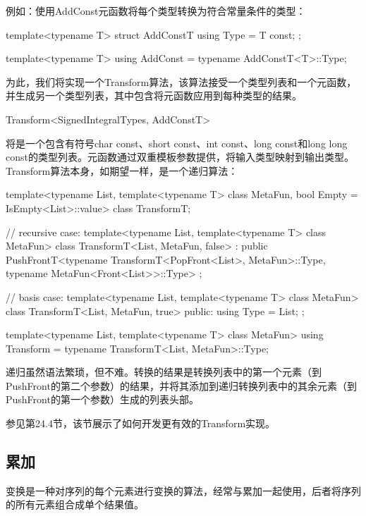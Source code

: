 例如：使用AddConst元函数将每个类型转换为符合常量条件的类型：

\begin{cpp}
template<typename T>
struct AddConstT
{
	using Type = T const;
};

template<typename T>
using AddConst = typename AddConstT<T>::Type;
\end{cpp}

为此，我们将实现一个Transform算法，该算法接受一个类型列表和一个元函数，并生成另一个类型列表，其中包含将元函数应用到每种类型的结果。

\begin{cpp}
Transform<SignedIntegralTypes, AddConstT>
\end{cpp}

将是一个包含有符号char const、short const、int const、long const和long long const的类型列表。元函数通过双重模板参数提供，将输入类型映射到输出类型。Transform算法本身，如期望一样，是一个递归算法：

\begin{cpp}
template<typename List, template<typename T> class MetaFun,
bool Empty = IsEmpty<List>::value>
class TransformT;

// recursive case:
template<typename List, template<typename T> class MetaFun>
class TransformT<List, MetaFun, false>
: public PushFrontT<typename TransformT<PopFront<List>, MetaFun>::Type,
typename MetaFun<Front<List>>::Type> {};

// basis case:
template<typename List, template<typename T> class MetaFun>
class TransformT<List, MetaFun, true> {
	public:
	using Type = List;
};

template<typename List, template<typename T> class MetaFun>
using Transform = typename TransformT<List, MetaFun>::Type;
\end{cpp}

递归虽然语法繁琐，但不难。转换的结果是转换列表中的第一个元素（到PushFront的第二个参数）的结果，并将其添加到递归转换列表中的其余元素（到PushFront的第一个参数）生成的列表头部。

参见第24.4节，该节展示了如何开发更有效的Transform实现。

\subsection{累加}

变换是一种对序列的每个元素进行变换的算法，经常与累加一起使用，后者将序列的所有元素组合成单个结果值。


